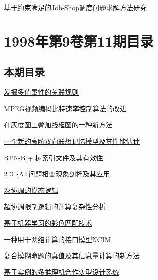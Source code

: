 \documentclass[a4paper]{article}
\begin{document}
\href{http://www.jos.org.cn/ch/reader/download_pdf.aspx?file_no=19981214&year_id=1998&quarter_id=12&falg=1}{基于约束满足的Job-Shop调度问题求解方法研究}


\section{\textbf{1998年第9卷第11期目录}}
\subsection{本期目录}
\href{http://www.jos.org.cn/ch/reader/download_pdf.aspx?file_no=19981101&year_id=1998&quarter_id=11&falg=1}{发掘多值属性的关联规则}

\href{http://www.jos.org.cn/ch/reader/download_pdf.aspx?file_no=19981102&year_id=1998&quarter_id=11&falg=1}{MPEG视频编码比特速率控制算法的改进}

\href{http://www.jos.org.cn/ch/reader/download_pdf.aspx?file_no=19981103&year_id=1998&quarter_id=11&falg=1}{在灰度图上叠加线框图的一种新方法}

\href{http://www.jos.org.cn/ch/reader/download_pdf.aspx?file_no=19981104&year_id=1998&quarter_id=11&falg=1}{一个新的高阶双向联想记忆模型及其性能估计}

\href{http://www.jos.org.cn/ch/reader/download_pdf.aspx?file_no=19981105&year_id=1998&quarter_id=11&falg=1}{RFN-B + 树索引文件及其有效性}

\href{http://www.jos.org.cn/ch/reader/download_pdf.aspx?file_no=19981106&year_id=1998&quarter_id=11&falg=1}{2-3-SAT问题相变现象剖析及其应用}

\href{http://www.jos.org.cn/ch/reader/download_pdf.aspx?file_no=19981107&year_id=1998&quarter_id=11&falg=1}{次协调的模态逻辑}

\href{http://www.jos.org.cn/ch/reader/download_pdf.aspx?file_no=19981108&year_id=1998&quarter_id=11&falg=1}{超协调限制逻辑的计算复杂性分析}

\href{http://www.jos.org.cn/ch/reader/download_pdf.aspx?file_no=19981109&year_id=1998&quarter_id=11&falg=1}{基于机器学习的彩色匹配技术}

\href{http://www.jos.org.cn/ch/reader/download_pdf.aspx?file_no=19981110&year_id=1998&quarter_id=11&falg=1}{一种用于网络计算的接口模型NCIM}

\href{http://www.jos.org.cn/ch/reader/download_pdf.aspx?file_no=19981111&year_id=1998&quarter_id=11&falg=1}{复合模糊命题的真值及其信息量计算的新方法}

\href{http://www.jos.org.cn/ch/reader/download_pdf.aspx?file_no=19981112&year_id=1998&quarter_id=11&falg=1}{基于实例的多推理机合作变型设计系统}
\end{document}
